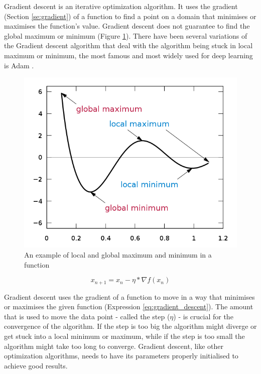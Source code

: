 \documentclass[times, utf8, diplomski]{fer}
\begin{document}
Gradient descent is an iterative optimization algorithm. It uses the gradient (Section \ref{se:gradient}) of a function to find a point on a domain that minimises or maximises the function's value. Gradient descent does not guarantee to find the global maximum or minimum (Figure \ref{fig:local_and_global_function_values}). There have been several variations of the Gradient descent algorithm that deal with the algorithm being stuck in local maximum or minimum, the most famous and most widely used for deep learning is Adam \citep{kingma_adam:_2014}.

\begin{figure}
  \includegraphics[scale=0.5]{figures/local_global_maxima_minima.png}
  \centering
  \caption{An example of local and global maximum and minimum in a function}
  \label{fig:local_and_global_function_values}
\end{figure}

\begin{equation} 
\label{eq:gradient_descent}
    x_{n+1} = x_n - \eta * \nabla{f(x_n)}
\end{equation}

Gradient descent uses the gradient of a function to move in a way that minimises or maximises the given function (Expression \ref{eq:gradient_descent}). The amount that is used to move the data point - called the step ($\eta$) - is crucial for the convergence of the algorithm. If the step is too big the algorithm might diverge or get stuck into a local minimum or maximum, while if the step is too small the algorithm might take too long to converge. Gradient descent, like other optimization algorithms, needs to have its parameters properly initialised to achieve good results.
\end{document}
